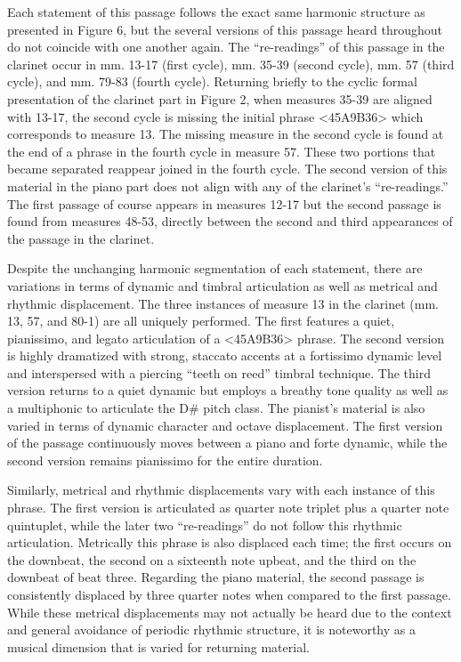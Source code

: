 Each statement of this passage follows the exact same harmonic structure as presented in Figure 6, but the several versions of this passage heard throughout do not coincide with one another again. The ``re-readings'' of this passage in the clarinet occur in mm. 13-17 (first cycle), mm. 35-39 (second cycle), mm. 57 (third cycle), and mm. 79-83 (fourth cycle). Returning briefly to the cyclic formal presentation of the clarinet part in Figure 2, when measures 35-39 are aligned with 13-17, the second cycle is missing the initial phrase <45A9B36> which corresponds to measure 13. The missing measure in the second cycle is found at the end of a phrase in the fourth cycle in measure 57. These two portions that became separated reappear joined in the fourth cycle. The second version of this material in the piano part does not align with any of the clarinet's ``re-readings.'' The first passage of course appears in measures 12-17 but the second passage is found from measures 48-53, directly between the second and third appearances of the passage in the clarinet.

Despite the unchanging harmonic segmentation of each statement, there are variations in terms of dynamic and timbral articulation as well as metrical and rhythmic displacement. The three instances of measure 13 in the clarinet (mm. 13, 57, and 80-1) are all uniquely performed. The first features a quiet, pianissimo, and legato articulation of a <45A9B36> phrase. The second version is highly dramatized with strong, staccato accents at a fortissimo dynamic level and interspersed with a piercing ``teeth on reed'' timbral technique. The third version returns to a quiet dynamic but employs a breathy tone quality as well as a multiphonic to articulate the D# pitch class. The pianist's material is also varied in terms of dynamic character and octave displacement. The first version of the passage continuously moves between a piano and forte dynamic, while the second version remains pianissimo for the entire duration.

Similarly, metrical and rhythmic displacements vary with each instance of this phrase. The first version is articulated as quarter note triplet plus a quarter note quintuplet, while the later two ``re-readings'' do not follow this rhythmic articulation. Metrically this phrase is also displaced each time; the first occurs on the downbeat, the second on a sixteenth note upbeat, and the third on the downbeat of beat three. Regarding the piano material, the second passage is consistently displaced by three quarter notes when compared to the first passage. While these metrical displacements may not actually be heard due to the context and general avoidance of periodic rhythmic structure, it is noteworthy as a musical dimension that is varied for returning material.


